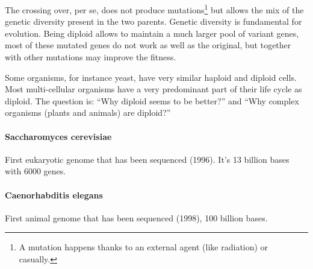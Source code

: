 The crossing over, per se, does not produce mutations\footnote{A mutation
happens thanks to an external agent (like radiation) or casually.} but allows
the mix of the genetic diversity present in the two parents. Genetic diversity
is fundamental for evolution. Being diploid allows to maintain a much larger
pool of variant genes, most of these mutated genes do not work as well as the
original, but together with other mutations may improve the fitness.

Some organisms, for instance yeast, have very similar haploid and diploid
cells. Most multi-cellular organisms have a very predominant part of their life
cycle as diploid. The question is: ``Why diploid seems to be better?'' and ``Why
complex organisms (plants and animals) are diploid?''

\paragraph*{Saccharomyces cerevisiae}
First eukaryotic genome that has been sequenced (1996). It's 13 billion bases
with 6000 genes.

\paragraph*{Caenorhabditis elegans}
First animal genome that has been sequenced (1998), 100 billion bases.
